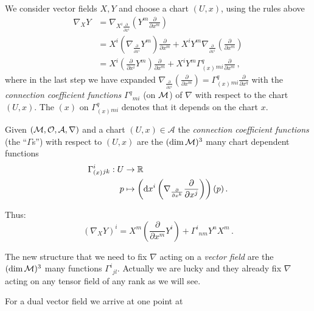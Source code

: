 \documentclass[11pt, a4paper, twocolumn]{article} %
\begin{document}
    We consider vector fields $X, Y$ and choose a chart $(U, x)$, using the rules above
    \begin{align*}
        \nabla_X Y &= \nabla_{X^i\frac{\partial}{\partial x^i}} \left( Y^m \frac{\partial}{\partial x^m} \right) \\
        &= X^i\left( \nabla_{\frac{\partial}{\partial x^i}} Y^m \right)\frac{\partial}{\partial x^m} +
        X^i Y^m \nabla_{\frac{\partial}{\partial x^i}}\left( \frac{\partial}{\partial x^m} \right) \\
        &= X^i\left( \frac{\partial}{\partial x^i} Y^m \right)\frac{\partial}{\partial x^m} +
        X^i Y^m \Gamma^q_{(x)}{}_{mi} \frac{\partial}{\partial x^m}\,,
    \end{align*}
    where in the last step we have expanded $\nabla_{\frac{\partial}{\partial x^i}}\left( \frac{\partial}{\partial x^m} \right)
    = \Gamma^q_{(x)}{}_{mi} \frac{\partial}{\partial x^q}$ with the \textit{connection coefficient functions} $\Gamma^q{}_{mi}$
    (on $\mathcal{M}$) of $\nabla$ with respect to the chart $(U,x)$.
    The $(x)$ on $\Gamma^q_{(x)}{}_{mi}$ denotes that it depends on the chart $x$.
    \begin{defn}
        Given $(\mathcal{M}, \mathcal{O}, \mathcal{A}, \nabla)$ and a chart $(U,x)\in\mathcal{A}$ the
        \textit{connection coefficient functions} (the ``$\Gamma$s'') with respect to $(U,x)$
        are the $(\dim \mathcal{M})^3$ many chart dependent functions
        \begin{align}
            \Gamma^i_{(x)}{}_{jk}: U &\to \mathbb{R} \\
            p &\mapsto \left( \operatorname{d\!} x^i \left( \nabla_{\frac{\partial}{\partial x^k}}\frac{\partial}{\partial x^j} \right) \right)(p)\,.
        \end{align}
    \end{defn}
    Thus:
    \begin{equation}
        \left( \nabla_X Y \right)^i = X^m\left( \frac{\partial}{\partial x^m}Y^i \right) +
        \Gamma^i{}_{nm}Y^n X^m\,.
    \end{equation}
    \begin{note}
        The new structure that we need to fix $\nabla$ acting on a \textit{vector field} are the $(\dim \mathcal{M})^3$ many functions 
        $\Gamma^{i}{}_{jl}$. Actually we are lucky and they already fix $\nabla$ acting on any tensor field of any rank as we
        will see.
    \end{note}
    For a dual vector field we arrive at one point at
\end{document}
